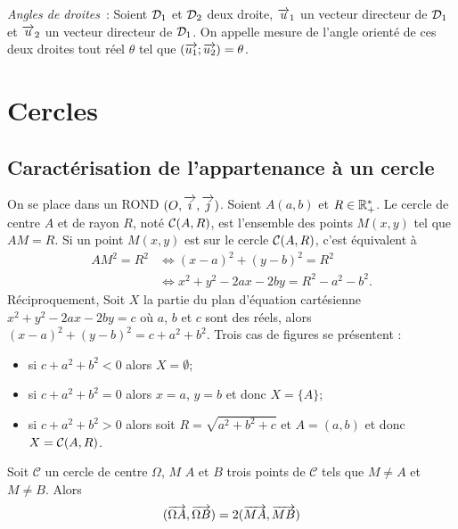 \emph{Angles de droites}~:
Soient \(\mathcal{D}_1\) et \(\mathcal{D}_2\) deux droite, \(\overrightarrow{u}_1\) un vecteur directeur de 
\(\mathcal{D}_1\) et \(\overrightarrow{u}_2\) un vecteur directeur de \(\mathcal{D}_1\). On appelle mesure de 
l'angle orienté de ces deux droites tout réel \(\theta\) tel que 
\((\overrightarrow{u_1};\overrightarrow{u_2}) = \theta\).

\section{Cercles}
\label{sec:cercle}

\subsection{Caractérisation de l'appartenance à un cercle}
\label{sec:caractcercle}

On se place dans un ROND \((O , \overrightarrow{i} , \overrightarrow{j})\). Soient \(A(a , b)\) et \(R \in 
\mathbb{R}_{+}^{*}\). Le cercle de centre \(A\) et de rayon \(R\), noté 
\(\mathcal{C}(A,R)\), est l'ensemble des points \(M(x , y)\) tel que \(AM = R\). Si 
un point \(M(x , y)\) est sur le cercle \(\mathcal{C}(A,R)\), c'est équivalent à
\begin{align}
    AM^2 = R^2 & \iff (x - a)^2 + (y - b)^2 = R^2\\
               &\iff x^2 + y^2 - 2ax - 2by = R^2 - a^2 - b^2.
\end{align}
Réciproquement, Soit \(X\) la partie du plan d'équation cartésienne \(x^2 + 
y^2 - 2ax - 2by = c\) où \(a\), \(b\) et \(c\) sont des réels, alors \((x - a)^2 + 
(y - b)^2 = c + a^2 + b^2\). Trois cas de figures se présentent :
\begin{itemize}
    \item si \(c + a^2 + b^2<0\) alors \(X = \emptyset\);
    \item si \(c + a^2 + b^2 = 0\) alors \(x = a\), \(y = b\) et donc \(X = 
        \{A\}\);
    \item si \(c + a^2 + b^2>0\) alors soit \(R = \sqrt{a^2 + b^2 + c}\) et \(A 
        = (a , b)\) et donc \(X = \mathcal{C}(A,R)\).
\end{itemize}

\begin{prop}
    \label{prop:cocy}
    Soit \(\mathcal{C}\) un cercle de centre \(\Omega\), \(M\) \(A\) et \(B\) 
    trois points de \(\mathcal{C}\) tels que \(M \neq A\) et \(M \neq B\). Alors 
    \begin{equation}
        (\overrightarrow{\Omega A},\overrightarrow{\Omega B}) = 2 (\overrightarrow{MA},\overrightarrow{MB})
    \end{equation}
\end{prop}

